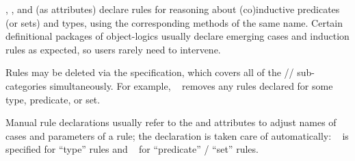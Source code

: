 \begin{isabellebody}
\begin{isamarkuptext}
\begin{descr}
  \item [\hyperlink{attribute.cases}{\mbox{\isa{cases}}}, \hyperlink{attribute.induct}{\mbox{\isa{induct}}}, and \hyperlink{attribute.coinduct}{\mbox{\isa{coinduct}}}] (as attributes) declare rules for reasoning about
  (co)inductive predicates (or sets) and types, using the
  corresponding methods of the same name.  Certain definitional
  packages of object-logics usually declare emerging cases and
  induction rules as expected, so users rarely need to intervene.

  Rules may be deleted via the  specification, which
  covers all of the //
  sub-categories simultaneously.  For example, \hyperlink{attribute.cases}{\mbox{}}~ removes any \hyperlink{attribute.cases}{\mbox{}} rules declared for
  some type, predicate, or set.
  
  Manual rule declarations usually refer to the \hyperlink{attribute.case-names}{\mbox{}} and \hyperlink{attribute.params}{\mbox{}} attributes to adjust names of
  cases and parameters of a rule; the \hyperlink{attribute.consumes}{\mbox{}}
  declaration is taken care of automatically: \hyperlink{attribute.consumes}{\mbox{}}~ is specified for ``type'' rules and \hyperlink{attribute.consumes}{\mbox{}}~ for ``predicate'' / ``set'' rules.

  \end{descr}%
\end{isamarkuptext}%
\isamarkuptrue%
%
\isadelimtheory
%
\endisadelimtheory
%
\isatagtheory
{}\isamarkupfalse%
%
\endisatagtheory
{\isafoldtheory}%
%
\isadelimtheory
%
\endisadelimtheory
\isanewline
\end{isabellebody}%
